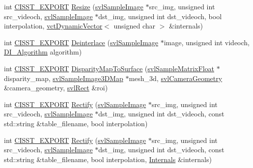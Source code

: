 \begin{DoxyCompactItemize}
\item 
int \hyperlink{cmn_export_macros_8h_a99393e0c3ac434b2605235bbe20684f8}{C\-I\-S\-S\-T\-\_\-\-E\-X\-P\-O\-R\-T} \hyperlink{namespacesvl_image_processing_ab6fbb6e07771c385bb43ea816db591fa}{Resize} (\hyperlink{classsvl_sample_image}{svl\-Sample\-Image} $\ast$src\-\_\-img, unsigned int src\-\_\-videoch, \hyperlink{classsvl_sample_image}{svl\-Sample\-Image} $\ast$dst\-\_\-img, unsigned int dst\-\_\-videoch, bool interpolation, \hyperlink{classvct_dynamic_vector}{vct\-Dynamic\-Vector}$<$ unsigned char $>$ \&internals)
\item 
int \hyperlink{cmn_export_macros_8h_a99393e0c3ac434b2605235bbe20684f8}{C\-I\-S\-S\-T\-\_\-\-E\-X\-P\-O\-R\-T} \hyperlink{namespacesvl_image_processing_a189bad878f0eaa18d73001249f1d6fae}{Deinterlace} (\hyperlink{classsvl_sample_image}{svl\-Sample\-Image} $\ast$image, unsigned int videoch, \hyperlink{namespacesvl_image_processing_a52b75591f8aa2cf8a2b4ea843b2f864a}{D\-I\-\_\-\-Algorithm} algorithm)
\item 
int \hyperlink{cmn_export_macros_8h_a99393e0c3ac434b2605235bbe20684f8}{C\-I\-S\-S\-T\-\_\-\-E\-X\-P\-O\-R\-T} \hyperlink{namespacesvl_image_processing_a1deb4c78574fb77a765f68bb5d6e9d26}{Disparity\-Map\-To\-Surface} (\hyperlink{svl_sample_matrix_types_8h_ae74daf1a1fd34516e4d5f580b15a24b7}{svl\-Sample\-Matrix\-Float} $\ast$disparity\-\_\-map, \hyperlink{svl_sample_image_types_8h_a3e34d5c72fa0d2a079d24e0668358bfc}{svl\-Sample\-Image3\-D\-Map} $\ast$mesh\-\_\-3d, \hyperlink{classsvl_camera_geometry}{svl\-Camera\-Geometry} \&camera\-\_\-geometry, \hyperlink{structsvl_rect}{svl\-Rect} \&roi)
\item 
int \hyperlink{cmn_export_macros_8h_a99393e0c3ac434b2605235bbe20684f8}{C\-I\-S\-S\-T\-\_\-\-E\-X\-P\-O\-R\-T} \hyperlink{namespacesvl_image_processing_ad9c69ec6ba8c2bca78c92e6c526aea03}{Rectify} (\hyperlink{classsvl_sample_image}{svl\-Sample\-Image} $\ast$src\-\_\-img, unsigned int src\-\_\-videoch, \hyperlink{classsvl_sample_image}{svl\-Sample\-Image} $\ast$dst\-\_\-img, unsigned int dst\-\_\-videoch, const std\-::string \&table\-\_\-filename, bool interpolation)
\item 
int \hyperlink{cmn_export_macros_8h_a99393e0c3ac434b2605235bbe20684f8}{C\-I\-S\-S\-T\-\_\-\-E\-X\-P\-O\-R\-T} \hyperlink{namespacesvl_image_processing_afd12d68b2945a19f275a133bca4e6232}{Rectify} (\hyperlink{classsvl_sample_image}{svl\-Sample\-Image} $\ast$src\-\_\-img, unsigned int src\-\_\-videoch, \hyperlink{classsvl_sample_image}{svl\-Sample\-Image} $\ast$dst\-\_\-img, unsigned int dst\-\_\-videoch, const std\-::string \&table\-\_\-filename, bool interpolation, \hyperlink{classsvl_image_processing_1_1_internals}{Internals} \&internals)

\end{DoxyCompactItemize}
